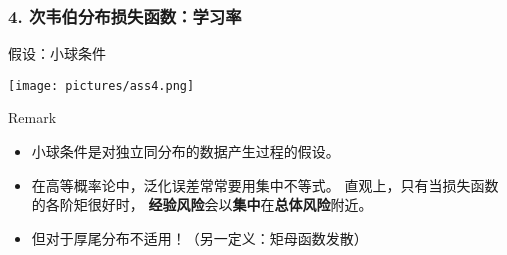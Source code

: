 \documentclass{beamer}
\begin{document}
\begin{frame}
    \frametitle{4. 次韦伯分布损失函数：学习率}
    \begin{block}{假设：小球条件}
        \begin{center}
            \texttt{[image: pictures/ass4.png]}
        \end{center}
    \end{block}
    \begin{alertblock}{Remark}
        \begin{itemize}
            \item 小球条件是对独立同分布的数据产生过程的假设。
            \pause
            \item 在高等概率论中，泛化误差常常要用集中不等式。
            直观上，只有当损失函数的各阶矩很好时，
            \textbf{经验风险}会以{\color{red}{高概率}}\textbf{集中}在\textbf{总体风险}附近。
            \pause
            \item 但对于厚尾分布不适用！（另一定义：矩母函数发散）
        \end{itemize}
    \end{alertblock}
\end{frame}
\end{document}
